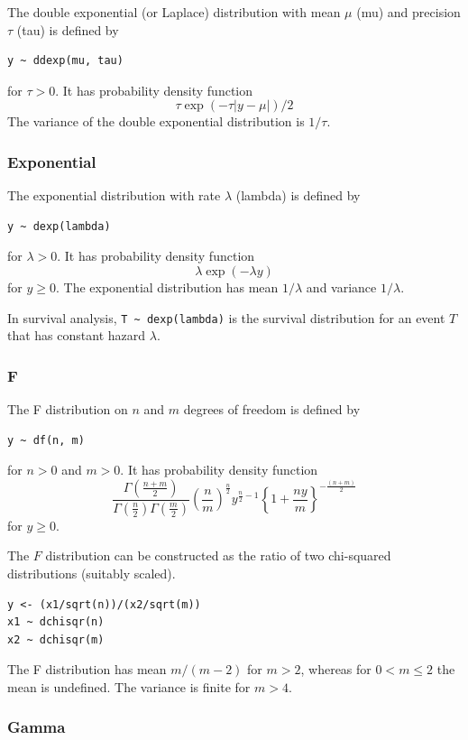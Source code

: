 \documentclass[11pt, a4paper, titlepage]{report}
\begin{document}
The double exponential (or Laplace) distribution with mean $\mu$ (mu) and
precision $\tau$ (tau) is defined by
\begin{verbatim}
y ~ ddexp(mu, tau)
\end{verbatim}
for $\tau > 0$. It has probability density function
\[
\tau \exp(-\tau | y - \mu |)/2
\]
The variance of the double exponential distribution is $1/\tau$.

\subsubsection{Exponential}
\label{bugs:dexp}

The exponential distribution with rate $\lambda$ (lambda) is defined by
\begin{verbatim}
y ~ dexp(lambda)
\end{verbatim}
for $\lambda > 0$. It has probability density function
\[
\lambda \exp(-\lambda y)
\]
for $y \geq 0$. The exponential distribution has mean $1/\lambda$ and
variance $1/\lambda$.

In survival analysis, \verb+T ~ dexp(lambda)+ is the survival distribution
for an event $T$ that has constant hazard $\lambda$.

\subsubsection{F}
\label{bugs:df}

The F distribution on $n$ and $m$ degrees of freedom is defined by
\begin{verbatim}
y ~ df(n, m)
\end{verbatim}
for $n > 0$ and $m > 0$. It has probability density function
\[
\frac{\Gamma(\frac{n + m}{2})}
     {\Gamma(\frac{n}{2}) \Gamma(\frac{m}{2})}
     \left(\frac{n}{m} \right)^{\frac{n}{2}} y^{\frac{n}{2} - 1} 
     \left\{1 + \frac{ny}{m} \right\}^{-\frac{(n + m)}{2}}
\]
for $y \geq 0$.       

The $F$ distribution can be constructed as the ratio of two chi-squared
distributions (suitably scaled).
\begin{verbatim}
y <- (x1/sqrt(n))/(x2/sqrt(m))
x1 ~ dchisqr(n)
x2 ~ dchisqr(m)
\end{verbatim}
The F distribution has mean $m/(m-2)$ for $m > 2$, whereas for $0 < m \leq 2$
the mean is undefined. The variance is finite for $m > 4$.

\subsubsection{Gamma}
\label{bugs:dgamma}
\end{document}
